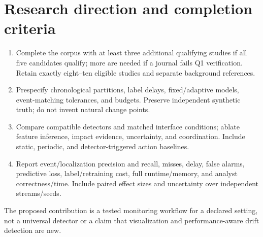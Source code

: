 \documentclass[10pt,a4paper]{article}
\begin{document}
\section{Research direction and completion criteria}
\begin{enumerate}[leftmargin=*,itemsep=3pt]
\item Complete the corpus with at least three additional qualifying studies if all five candidates qualify; more are needed if a journal fails Q1 verification. Retain exactly eight--ten eligible studies and separate background references.
\item Prespecify chronological partitions, label delays, fixed/adaptive models, event-matching tolerances, and budgets. Preserve independent synthetic truth; do not invent natural change points.
\item Compare compatible detectors and matched interface conditions; ablate feature inference, impact evidence, uncertainty, and coordination. Include static, periodic, and detector-triggered action baselines.
\item Report event/localization precision and recall, misses, delay, false alarms, predictive loss, label/retraining cost, full runtime/memory, and analyst correctness/time. Include paired effect sizes and uncertainty over independent streams/seeds.
\end{enumerate}
The proposed contribution is a tested monitoring workflow for a declared setting, not a universal detector or a claim that visualization and performance-aware drift detection are new.
\end{document}
